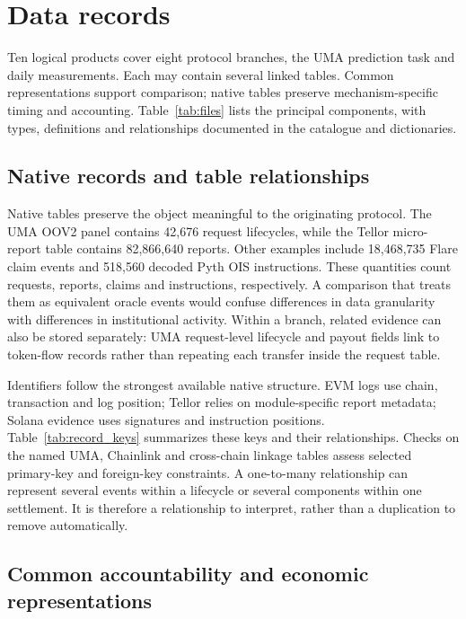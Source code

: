 \section{Data records}

Ten logical products cover eight protocol branches, the UMA prediction task and daily measurements. Each may contain several linked tables. Common representations support comparison; native tables preserve mechanism-specific timing and accounting. Table~\ref{tab:files} lists the principal components, with types, definitions and relationships documented in the catalogue and dictionaries.



\subsection{Native records and table relationships}

Native tables preserve the object meaningful to the originating protocol. The UMA OOV2 panel contains 42,676 request lifecycles, while the Tellor micro-report table contains 82,866,640 reports. Other examples include 18,468,735 Flare claim events and 518,560 decoded Pyth OIS instructions. These quantities count requests, reports, claims and instructions, respectively. A comparison that treats them as equivalent oracle events would confuse differences in data granularity with differences in institutional activity. Within a branch, related evidence can also be stored separately: UMA request-level lifecycle and payout fields link to token-flow records rather than repeating each transfer inside the request table.

Identifiers follow the strongest available native structure. EVM logs use chain, transaction and log position; Tellor relies on module-specific report metadata; Solana evidence uses signatures and instruction positions. Table~\ref{tab:record_keys} summarizes these keys and their relationships. Checks on the named UMA, Chainlink and cross-chain linkage tables assess selected primary-key and foreign-key constraints. A one-to-many relationship can represent several events within a lifecycle or several components within one settlement. It is therefore a relationship to interpret, rather than a duplication to remove automatically.



\subsection{Common accountability and economic representations}

